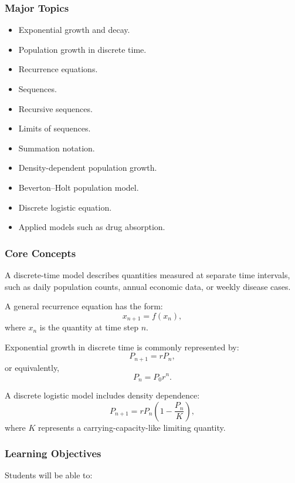 \documentclass[11pt]{article}
\begin{document}
\subsubsection*{Major Topics}

\begin{itemize}
    \item Exponential growth and decay.
    \item Population growth in discrete time.
    \item Recurrence equations.
    \item Sequences.
    \item Recursive sequences.
    \item Limits of sequences.
    \item Summation notation.
    \item Density-dependent population growth.
    \item Beverton--Holt population model.
    \item Discrete logistic equation.
    \item Applied models such as drug absorption.
\end{itemize}

\subsubsection*{Core Concepts}

A discrete-time model describes quantities measured at separate time intervals, such as daily population counts, annual economic data, or weekly disease cases.

A general recurrence equation has the form:
\[
x_{n+1} = f(x_n),
\]
where \(x_n\) is the quantity at time step \(n\).

Exponential growth in discrete time is commonly represented by:
\[
P_{n+1} = rP_n,
\]
or equivalently,
\[
P_n = P_0r^n.
\]

A discrete logistic model includes density dependence:
\[
P_{n+1} = rP_n\left(1-\frac{P_n}{K}\right),
\]
where \(K\) represents a carrying-capacity-like limiting quantity.

\subsubsection*{Learning Objectives}

Students will be able to:
\end{document}
